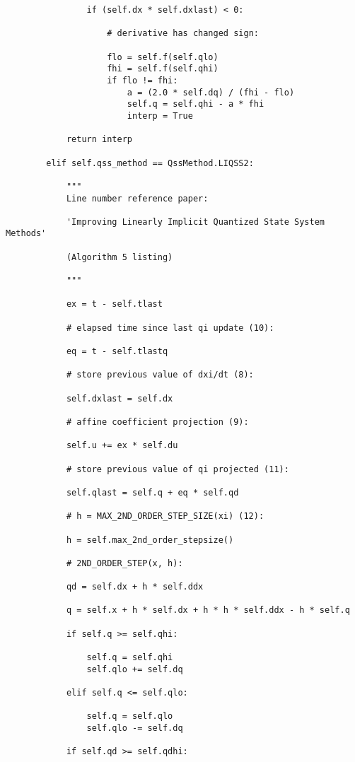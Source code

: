 \begin{lstlisting}
                if (self.dx * self.dxlast) < 0:

                    # derivative has changed sign:

                    flo = self.f(self.qlo)
                    fhi = self.f(self.qhi)
                    if flo != fhi:
                        a = (2.0 * self.dq) / (fhi - flo)
                        self.q = self.qhi - a * fhi
                        interp = True

            return interp

        elif self.qss_method == QssMethod.LIQSS2:

            """
            Line number reference paper:

            'Improving Linearly Implicit Quantized State System Methods'

            (Algorithm 5 listing)

            """

            ex = t - self.tlast

            # elapsed time since last qi update (10):

            eq = t - self.tlastq

            # store previous value of dxi/dt (8):

            self.dxlast = self.dx

            # affine coefficient projection (9):

            self.u += ex * self.du

            # store previous value of qi projected (11):

            self.qlast = self.q + eq * self.qd

            # h = MAX_2ND_ORDER_STEP_SIZE(xi) (12):

            h = self.max_2nd_order_stepsize()

            # 2ND_ORDER_STEP(x, h):

            qd = self.dx + h * self.ddx

            q = self.x + h * self.dx + h * h * self.ddx - h * self.q

            if self.q >= self.qhi:

                self.q = self.qhi
                self.qlo += self.dq

            elif self.q <= self.qlo:

                self.q = self.qlo
                self.qlo -= self.dq

            if self.qd >= self.qdhi:


\end{lstlisting}
